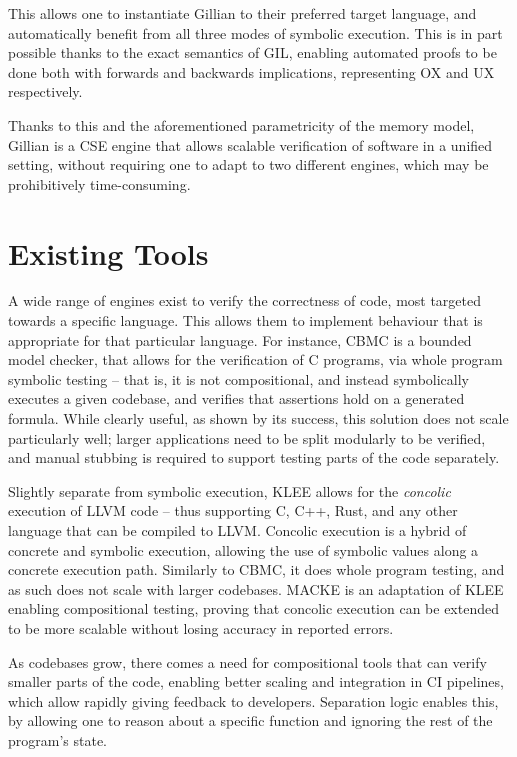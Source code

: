 This allows one to instantiate Gillian to their preferred target language, and automatically benefit from all three modes of symbolic execution. This is in part possible thanks to the exact \cite{exactsl} semantics of GIL, enabling automated proofs to be done both with forwards and backwards implications, representing OX and UX respectively.

Thanks to this and the aforementioned parametricity of the memory model, Gillian is a CSE engine that allows scalable verification of software in a unified setting, without requiring one to adapt to two different engines, which may be prohibitively time-consuming.

\section{Existing Tools} \label{sec:existing-tools}

A wide range of engines exist to verify the correctness of code, most targeted towards a specific language. This allows them to implement behaviour that is appropriate for that particular language.
For instance, CBMC \cite{cbmc} is a bounded model checker, that allows for the verification of C programs, via whole program symbolic testing -- that is, it is not compositional, and instead symbolically executes a given codebase, and verifies that assertions hold on a generated formula. While clearly useful, as shown by its success, this solution does not scale particularly well; larger applications need to be split modularly to be verified, and manual stubbing is required to support testing parts of the code separately.

Slightly separate from symbolic execution, KLEE \cite{klee} allows for the \emph{concolic} execution of LLVM code -- thus supporting C, C++, Rust, and any other language that can be compiled to LLVM. Concolic execution is a hybrid of concrete and symbolic execution, allowing the use of symbolic values along a concrete execution path. Similarly to CBMC, it does whole program testing, and as such does not scale with larger codebases. MACKE \cite{macke} is an adaptation of KLEE enabling compositional testing, proving that concolic execution can be extended to be more scalable without losing accuracy in reported errors.

As codebases grow, there comes a need for compositional tools that can verify smaller parts of the code, enabling better scaling and integration in CI pipelines, which allow rapidly giving feedback to developers. Separation logic enables this, by allowing one to reason about a specific function and ignoring the rest of the program's state.

